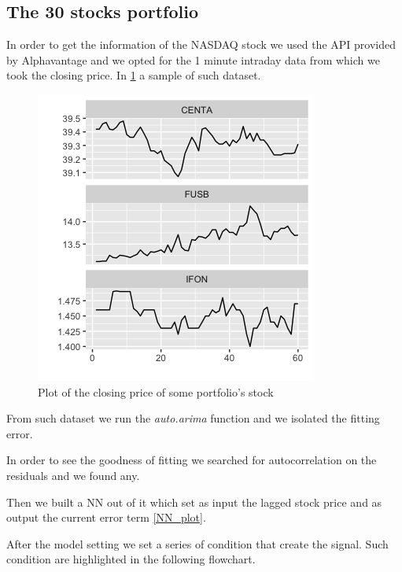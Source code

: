 \documentclass[twocolumn]{article}
\begin{document}
\subsection{The 30 stocks portfolio}
In order to get the information of the NASDAQ stock we used the API provided by Alphavantage \cite{_alpha_} and we opted for the 1 minute intraday data from which we took the closing price. In \ref{portfolio} a sample of such dataset.

\begin{figure}
    \centering
    \includegraphics[width=1\linewidth, ]{Paper/images/Rplot.png}
    \caption{Plot of the closing price of some portfolio's stock}
    \label{portfolio}
\end{figure}

From such dataset we run the \textit{auto.arima} function and we isolated the fitting error. %

In order to see the goodness of fitting we searched for autocorrelation on the residuals and we found any.

Then we built a NN out of it which set as input the lagged stock price and as output the current error term \ref{NN_plot}.

After the model setting we set a series of condition that create the signal. Such condition are highlighted in the following flowchart.
\end{document}
